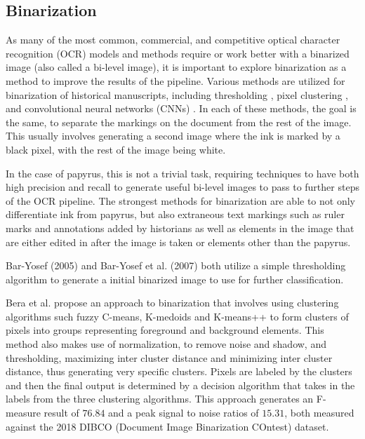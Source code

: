 \documentclass[12pt,a4paper,final]{article}
\begin{document}
\subsection{Binarization}
As many of the most common, commercial, and competitive optical character recognition (OCR) models and methods require or work better with a binarized image \cite{Gupta, Smith, Bar-Yosef2005, Bar-Yosef2007} (also called a bi-level image), it is important to explore binarization as a method to improve the results of the pipeline.
Various methods are utilized for binarization of historical manuscripts, including thresholding \cite{Bar-Yosef2005, Bar-Yosef2007}, pixel clustering \cite{Bera}, and convolutional neural networks (CNNs) \cite{Dhali2019, Dhali2020, Xiong}. In each of these methods, the goal is the same, to separate the markings on the document from the rest of the image. This usually involves generating a second image where the ink is marked by a black pixel, with the rest of the image being white.

In the case of papyrus, this is not a trivial task, requiring techniques to have both high precision and recall to generate useful bi-level images to pass to further steps of the OCR pipeline. The strongest methods for binarization are able to not only differentiate ink from papyrus, but also extraneous text markings such as ruler marks and annotations added by historians as well as elements in the image that are either edited in after the image is taken or elements other than the papyrus.

Bar-Yosef (2005)\cite{Bar-Yosef2005} and Bar-Yosef et al. (2007)\cite{Bar-Yosef2005} both utilize a simple thresholding algorithm to generate a initial binarized image to use for further classification.

Bera et al.\cite{Bera} propose an approach to binarization that involves using clustering algorithms such fuzzy C-means, K-medoids and K-means++ to form clusters of pixels into groups representing foreground and background elements. This method also makes use of normalization, to remove noise and shadow, and thresholding, maximizing inter cluster distance and minimizing inter cluster distance, thus generating very specific clusters. Pixels are labeled by the clusters and then the final output is determined by a decision algorithm that takes in the labels from the three clustering algorithms. This approach generates an F-measure result of $76.84$ and a peak signal to noise ratios of $15.31$, both measured against the 2018 DIBCO (Document Image Binarization COntest) dataset\cite{DIBCO2018}.
\end{document}
